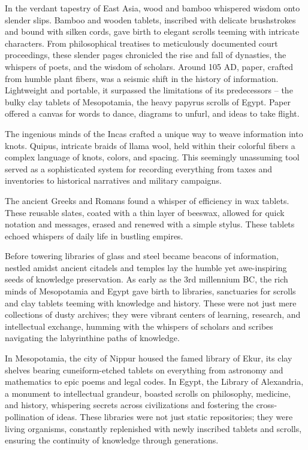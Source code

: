 \documentclass[
  letterpaper,
  DIV=11,
  numbers=noendperiod]{scrreprt}
\begin{document}
In the verdant tapestry of East Asia, wood and bamboo whispered wisdom
onto slender slips. Bamboo and wooden tablets, inscribed with delicate
brushstrokes and bound with silken cords, gave birth to elegant scrolls
teeming with intricate characters. From philosophical treatises to
meticulously documented court proceedings, these slender pages
chronicled the rise and fall of dynasties, the whispers of poets, and
the wisdom of scholars. Around 105 AD, paper, crafted from humble plant
fibers, was a seismic shift in the history of information. Lightweight
and portable, it surpassed the limitations of its predecessors -- the
bulky clay tablets of Mesopotamia, the heavy papyrus scrolls of Egypt.
Paper offered a canvas for words to dance, diagrams to unfurl, and ideas
to take flight.

The ingenious minds of the Incas crafted a unique way to weave
information into knots. Quipus, intricate braids of llama wool, held
within their colorful fibers a complex language of knots, colors, and
spacing. This seemingly unassuming tool served as a sophisticated system
for recording everything from taxes and inventories to historical
narratives and military campaigns.

The ancient Greeks and Romans found a whisper of efficiency in wax
tablets. These reusable slates, coated with a thin layer of beeswax,
allowed for quick notation and messages, erased and renewed with a
simple stylus. These tablets echoed whispers of daily life in bustling
empires.

Before towering libraries of glass and steel became beacons of
information, nestled amidst ancient citadels and temples lay the humble
yet awe-inspiring seeds of knowledge preservation. As early as the 3rd
millennium BC, the rich minds of Mesopotamia and Egypt gave birth to
libraries, sanctuaries for scrolls and clay tablets teeming with
knowledge and history. These were not just mere collections of dusty
archives; they were vibrant centers of learning, research, and
intellectual exchange, humming with the whispers of scholars and scribes
navigating the labyrinthine paths of knowledge.

In Mesopotamia, the city of Nippur housed the famed library of Ekur, its
clay shelves bearing cuneiform-etched tablets on everything from
astronomy and mathematics to epic poems and legal codes. In Egypt, the
Library of Alexandria, a monument to intellectual grandeur, boasted
scrolls on philosophy, medicine, and history, whispering secrets across
civilizations and fostering the cross-pollination of ideas. These
libraries were not just static repositories; they were living organisms,
constantly replenished with newly inscribed tablets and scrolls,
ensuring the continuity of knowledge through generations.
\end{document}
